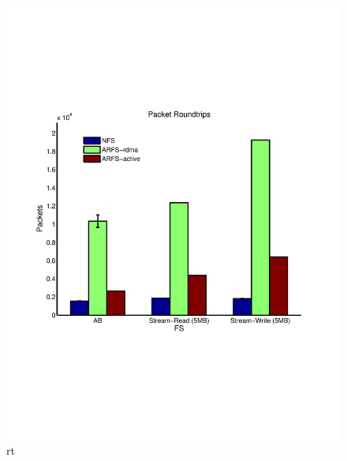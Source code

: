 \documentclass[10pt]{article}
\begin{document}
\begin{itemize}
\begin{itemize}
\begin{figure}
  \centering
\includegraphics[scale=0.5, trim = 0 200 0 200]{../../results/matlab/rt.pdf}
  \caption{rt}\label{rt}
\end{figure}


\end{itemize}
\end{itemize}
\end{document}
